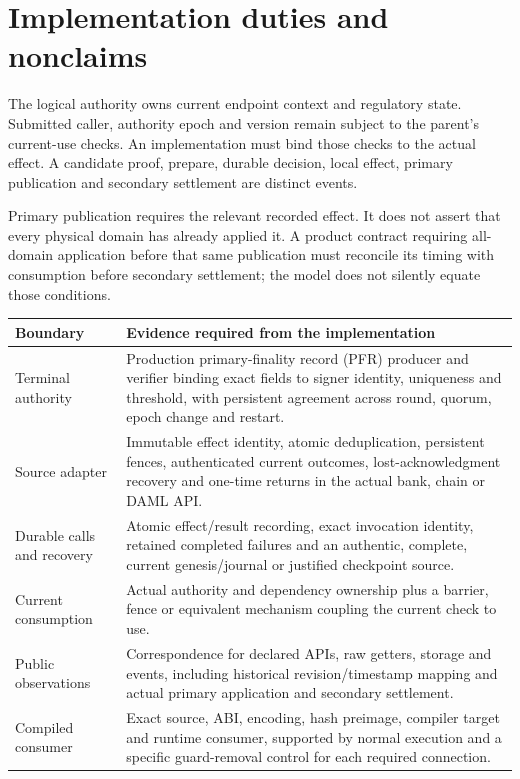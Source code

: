 \documentclass[10pt,a4paper]{article}
\begin{document}
\clearpage
\section*{Implementation duties and nonclaims}
The logical authority owns current endpoint context and regulatory state.
Submitted caller, authority epoch and version remain subject to the parent's
current-use checks. An implementation must bind those checks to the actual
effect. A candidate proof, prepare, durable decision, local effect, primary
publication and secondary settlement are distinct events.

Primary publication requires the relevant recorded effect. It does not assert
that every physical domain has already applied it. A product contract requiring
all-domain application before that same publication must reconcile its timing
with consumption before secondary settlement; the model does not silently
equate those conditions.

{\small
\begin{tabularx}{\textwidth}{@{}L{0.23\textwidth}Y@{}}
\toprule
Boundary & Evidence required from the implementation \\
\midrule
Terminal authority & Production primary-finality record (PFR) producer and
  verifier binding exact fields to signer identity, uniqueness and threshold,
  with persistent agreement across round, quorum, epoch change and restart. \\
Source adapter & Immutable effect identity, atomic deduplication, persistent
  fences, authenticated current outcomes, lost-acknowledgment recovery and
  one-time returns in the actual bank, chain or DAML API. \\
Durable calls and recovery & Atomic effect/result recording, exact invocation
  identity, retained completed failures and an authentic, complete, current
  genesis/journal or justified checkpoint source. \\
Current consumption & Actual authority and dependency ownership plus a
  barrier, fence or equivalent mechanism coupling the current check to use. \\
Public observations & Correspondence for declared APIs, raw getters, storage
  and events, including historical revision/timestamp mapping and actual
  primary application and secondary settlement. \\
Compiled consumer & Exact source, ABI, encoding, hash preimage, compiler
  target and runtime consumer, supported by normal execution and a specific
  guard-removal control for each required connection. \\
\bottomrule
\end{tabularx}}
\end{document}
